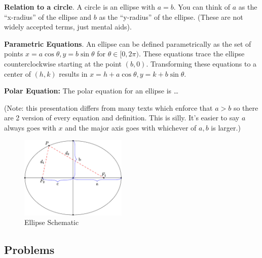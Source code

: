 \documentclass[
]{article}
\begin{document}
\textbf{Relation to a circle}. A circle is an ellipse with \(a=b\). You
can think of \(a\) as the ``x-radius'' of the ellipse and \(b\) as the
``y-radius'' of the ellipse. (These are not widely accepted terms, just
mental aids).

\textbf{Parametric Equations}. An ellipse can be defined parametrically
as the set of points \(x = a \cos \theta, y = b \sin \theta\) for
\(\theta \in [0,2\pi)\). These equations trace the ellipse
counterclockwise starting at the point \((b,0).\) Transforming these
equations to a center of \((h,k)\) results in
\(x = h + a \cos \theta, y = k + b \sin \theta\).

\textbf{Polar Equation:} The polar equation for an ellipse is \ldots{}

(Note: this presentation differs from many texts which enforce that
\(a>b\) so there are 2 version of every equation and definition. This is
silly. It's easier to say \(a\) always goes with \(x\) and the major
axis goes with whichever of \(a,b\) is larger.)

\begin{figure}
\centering
\includegraphics[width=2in,height=\textheight]{workspace.jpeg}
\caption{Ellipse Schematic}
\end{figure}

\hypertarget{problems}{%
\subsection{Problems}\label{problems}}
\end{document}
